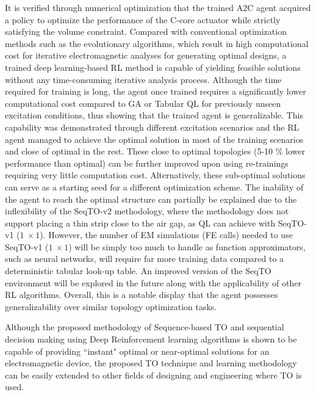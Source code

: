 It is verified through numerical optimization that the trained A2C agent acquired a policy to optimize the performance of the C-core actuator while strictly satisfying the volume constraint. Compared with conventional optimization methods such as the evolutionary algorithms, which result in high computational cost for iterative electromagnetic analyses for generating optimal designs, a trained deep learning-based RL method is capable of yielding feasible solutions without any time-consuming iterative analysis process. Although the time required for training is long, the agent once trained requires a significantly lower computational cost compared to GA or Tabular QL for previously unseen excitation conditions, thus showing that the trained agent is generalizable. This capability was demonstrated through different excitation scenarios and the RL agent managed to achieve the optimal solution in most of the training scenarios and close of optimal in the rest. 
These close to optimal topologies (5-10 \% lower performance than optimal) can be further improved upon using re-trainings requiring very little computation cost. Alternatively, these sub-optimal solutions can serve as a starting seed for a different optimization scheme. The inability of the agent to reach the optimal structure can partially be explained due to the inflexibility of the SeqTO-v2 methodology, where the methodology does not support placing a thin strip close to the air gap, as QL can achieve with SeqTO-v1 ($1\ \times 1$). 
However, the number of EM simulations (FE calls) needed to use SeqTO-v1 ($1\ \times 1$) will be simply too much to handle as function approximators, such as neural networks, will require far more training data compared to a deterministic tabular look-up table. An improved version of the SeqTO environment will be explored in the future along with the applicability of other RL algorithms.
Overall, this is a notable display that the agent possesses generalizability over similar topology optimization tasks. 

Although the proposed methodology of Sequence-based TO and sequential decision making using Deep Reinforcement learning algorithms is shown to be capable of providing ``instant" optimal or near-optimal solutions for an electromagnetic device, the proposed TO technique and learning methodology can be easily extended to other fields of designing and engineering where TO is used.


